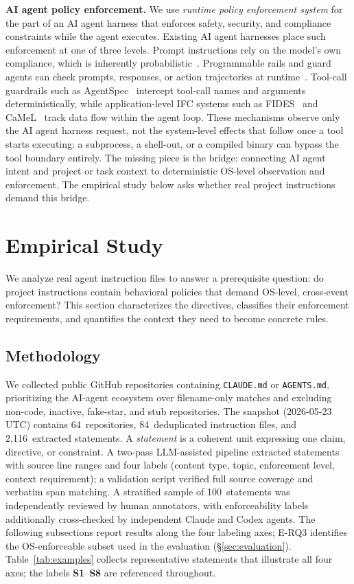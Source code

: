 \textbf{AI agent policy enforcement.}
We use \emph{runtime policy enforcement system} for the part of an AI
agent harness that enforces safety, security, and compliance constraints
while the agent executes. Existing AI agent harnesses place such
enforcement at one of three levels.
Prompt instructions rely on the model's own compliance,
which is inherently probabilistic~\cite{liu2024lost}. Programmable rails
and guard agents can check prompts, responses, or action trajectories at
runtime~\cite{rebedea2023nemo,xiang2025guardagent}. Tool-call guardrails
such as AgentSpec~\cite{wang2025agentspec} intercept tool-call names and
arguments deterministically, while application-level IFC systems such as
FIDES~\cite{costa2025fides} and CaMeL~\cite{debenedetti2025camel} track
data flow within the agent loop.
These mechanisms observe only the AI agent harness request, not the system-level
effects that follow once a tool starts executing: a subprocess, a
shell-out, or a compiled binary can bypass the tool boundary entirely.
The missing piece is the bridge: connecting AI agent intent and project
or task context to deterministic OS-level observation and enforcement. The empirical
study below asks whether real project instructions demand this bridge.

\section{Empirical Study}
\label{sec:empirical}

We analyze real agent instruction files to answer a prerequisite question:
do project instructions contain behavioral policies that demand
OS-level, cross-event enforcement? This section characterizes the
directives, classifies their enforcement requirements, and quantifies the
context they need to become concrete rules.

\subsection{Methodology}

We collected public GitHub repositories containing \texttt{CLAUDE.md} or
\texttt{AGENTS.md}, prioritizing the AI-agent ecosystem over
filename-only matches and excluding non-code, inactive, fake-star, and
stub repositories. The snapshot (2026-05-23 UTC) contains
64~repositories, 84~deduplicated instruction files, and
2{,}116~extracted statements. A \emph{statement} is a coherent unit
expressing one claim, directive, or constraint. A two-pass LLM-assisted
pipeline extracted statements with source line ranges and four labels
(content type, topic, enforcement level, context requirement); a
validation script verified full source coverage and verbatim span
matching. A stratified sample of 100~statements was independently
reviewed by human annotators, with enforceability labels additionally
cross-checked by independent Claude and Codex agents. The following
subsections report results along the four labeling axes; E-RQ3
identifies the OS-enforceable subset used in the evaluation
(\S\ref{sec:evaluation}).
Table~\ref{tab:examples} collects representative statements that
illustrate all four axes; the labels \textbf{S1}--\textbf{S8} are
referenced throughout.

